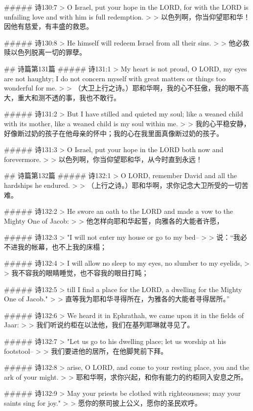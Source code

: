 ##### 诗130:7
> O Israel, put your hope in the LORD, for with the LORD is unfailing love and with him is full redemption.
>
> 以色列啊，你当仰望耶和华！因他有慈爱，有丰盛的救恩。


##### 诗130:8
> He himself will redeem Israel from all their sins.
>
> 他必救赎以色列脱离一切的罪孽。


## 诗篇第131篇
##### 诗131:1
> My heart is not proud, O LORD, my eyes are not haughty; I do not concern myself with great matters or things too wonderful for me.
>
> （大卫上行之诗。）耶和华啊，我的心不狂傲，我的眼不高大，重大和测不透的事，我也不敢行。


##### 诗131:2
> But I have stilled and quieted my soul; like a weaned child with its mother, like a weaned child is my soul within me.
>
> 我的心平稳安静，好像断过奶的孩子在他母亲的怀中；我的心在我里面真像断过奶的孩子。


##### 诗131:3
> O Israel, put your hope in the LORD both now and forevermore.
>
> 以色列啊，你当仰望耶和华，从今时直到永远！


## 诗篇第132篇
##### 诗132:1
> O LORD, remember David and all the hardships he endured.
>
> （上行之诗。）耶和华啊，求你记念大卫所受的一切苦难。


##### 诗132:2
> He swore an oath to the LORD and made a vow to the Mighty One of Jacob:
>
> 他怎样向耶和华起誓，向雅各的大能者许愿，


##### 诗132:3
> "I will not enter my house or go to my bed--
>
> 说：“我必不进我的帐幕，也不上我的床榻；


##### 诗132:4
> I will allow no sleep to my eyes, no slumber to my eyelids,
>
> 我不容我的眼睛睡觉，也不容我的眼目打盹；


##### 诗132:5
> till I find a place for the LORD, a dwelling for the Mighty One of Jacob."
>
> 直等我为耶和华寻得所在，为雅各的大能者寻得居所。”


##### 诗132:6
> We heard it in Ephrathah, we came upon it in the fields of Jaar:
>
> 我们听说约柜在以法他，我们在基列耶琳就寻见了。


##### 诗132:7
> "Let us go to his dwelling place; let us worship at his footstool--
>
> 我们要进他的居所，在他脚凳前下拜。


##### 诗132:8
> arise, O LORD, and come to your resting place, you and the ark of your might.
>
> 耶和华啊，求你兴起，和你有能力的约柜同入安息之所。


##### 诗132:9
> May your priests be clothed with righteousness; may your saints sing for joy."
>
> 愿你的祭司披上公义，愿你的圣民欢呼。


